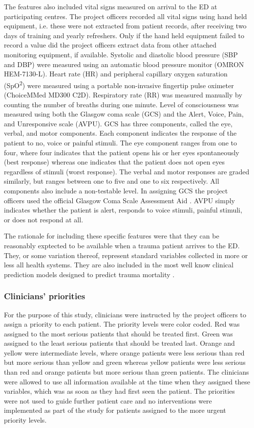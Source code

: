 \documentclass[10pt,letterpaper]{article}\usepackage[]{graphicx}\usepackage[]{color}
\begin{document}
The features also included vital signs measured on arrival to the ED at
participating centres. The project officers recorded all vital signs using hand
held equipment, i.e. these were not extracted from patient records, after
receiving two days of training and yearly refreshers. Only if the hand held
equipment failed to record a value did the project officers extract data from
other attached monitoring equipment, if available. Systolic and diastolic blood
pressure (SBP and DBP) were measured using an automatic blood pressure monitor
(OMRON HEM-7130-L). Heart rate (HR) and peripheral capillary oxygen saturation
(SpO\textsuperscript{2}) were measured using a portable non-invasive fingertip
pulse oximeter (ChoiceMMed MD300 C2D). Respiratory rate (RR) was measured
manually by counting the number of breaths during one minute. Level of
consciousness was measured using both the Glasgow coma scale (GCS) and the
Alert, Voice, Pain, and Unresponsive scale (AVPU). GCS has three components,
called the eye, verbal, and motor components. Each component indicates the
response of the patient to no, voice or painful stimuli. The eye component
ranges from one to four, where four indicates that the patient opens his or her
eyes spontaneously (best response) whereas one indicates that the patient does
not open eyes regardless of stimuli (worst response). The verbal and motor
responses are graded similarly, but ranges between one to five and one to six
respectively. All components also include a non-testable level. In assigning GCS
the project officers used the official Glasgow Coma Scale Assessment Aid
\cite{GCSAID}. AVPU simply indicates whether the patient is alert, responds to
voice stimuli, painful stimuli, or does not respond at all.

The rationale for including these specific features were that they can be
reasonably exptected to be available when a trauma patient arrives to the
ED. They, or some variation thereof, represent standard variables collected in
more or less all health systems. They are also included in the most well know
clinical prediction models designed to predict trauma mortality \cite{Rehn2011}.

\subsubsection*{Clinicians' priorities}
For the purpose of this study, clinicians were instructed by the project
officers to assign a priority to each patient. The priority levels were color
coded. Red was assigned to the most serious patients that should be treated
first. Green was assigned to the least serious patients that should be treated
last. Orange and yellow were intermediate levels, where orange patients were
less serious than red but more serious than yellow and green whereas yellow
patients were less serious than red and orange patients but more serious than
green patients. The clinicians were allowed to use all information available at
the time when they assigned these variables, which was as soon as they had first
seen the patient. The priorities were not used to guide further patient care and
no interventions were implemented as part of the study for patients assigned to
the more urgent priority levels.
\end{document}
